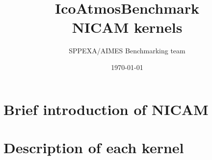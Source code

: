 \documentclass[a4paper,twoside,openright]{report}
\title{{{\Large IcoAtmosBenchmark \\ NICAM kernels} }}
\author{{{SPPEXA/AIMES Benchmarking team}}}
\date{\today}
\begin{document}
\maketitle
\tableofcontents

\cleardoublepage

\chapter{Brief introduction of NICAM} \label{chap:intronicam}

\clearpage

\chapter{Description of each kernel} \label{chap:kernelnicam}









\clearpage





\end{document}
